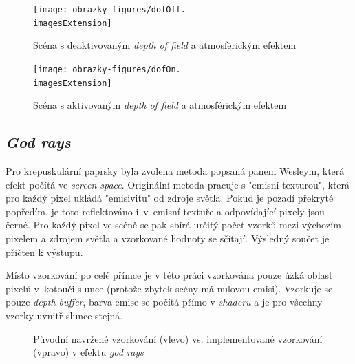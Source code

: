 \begin{figure}[H]
	\centering
	\texttt{[image: obrazky-figures/dofOff.\\imagesExtension]}
	\caption{Scéna s deaktivovaným \textit{depth of field} a atmosférickým efektem}
\end{figure}

\vfill
	
\begin{figure}[H]
	\texttt{[image: obrazky-figures/dofOn.\\imagesExtension]}
	\caption{Scéna s aktivovaným \textit{depth of field} a atmosférickým efektem}
\end{figure}

\pagebreak
\subsection{\textit{God rays}}
Pro krepuskulární paprsky byla zvolena metoda popsaná panem Wesleym, která efekt počítá ve \textit{screen space}. Originální metoda pracuje s "emisní texturou", která pro každý pixel ukládá "emisivitu" od zdroje světla. Pokud je pozadí překryté popředím, je toto reflektováno i~v~emisní textuře a odpovídající pixely jsou černé. Pro každý pixel ve scéně se pak sbírá určitý počet vzorků mezi výchozím pixelem a zdrojem světla a vzorkované hodnoty se sčítají. Výsledný součet je přičten k výstupu.

Místo vzorkování po celé přímce je v této práci vzorkována pouze úzká oblast pixelů v~kotouči slunce (protože zbytek scény má nulovou emisi). Vzorkuje se pouze \textit{depth buffer}, barva emise se počítá přímo v \textit{shaderu} a je pro všechny vzorky uvnitř slunce stejná.

\begin{figure}[H]
	\centering
	\hspace{20mm}
	\caption{Původní navržené vzorkování (vlevo) vs. implementované vzorkování (vpravo) v efektu \textit{god rays}}
\end{figure}

